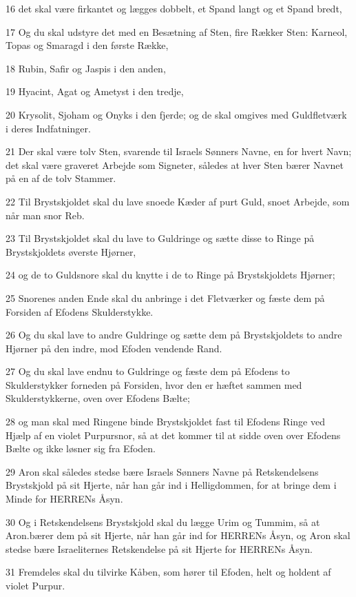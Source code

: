 \par 16 det skal være firkantet og lægges dobbelt, et Spand langt og et Spand bredt,
\par 17 Og du skal udstyre det med en Besætning af Sten, fire Rækker Sten: Karneol, Topas og Smaragd i den første Række,
\par 18 Rubin, Safir og Jaspis i den anden,
\par 19 Hyacint, Agat og Ametyst i den tredje,
\par 20 Krysolit, Sjoham og Onyks i den fjerde; og de skal omgives med Guldfletværk i deres Indfatninger.
\par 21 Der skal være tolv Sten, svarende til Israels Sønners Navne, en for hvert Navn; det skal være graveret Arbejde som Signeter, således at hver Sten bærer Navnet på en af de tolv Stammer.
\par 22 Til Brystskjoldet skal du lave snoede Kæder af purt Guld, snoet Arbejde, som når man snor Reb.
\par 23 Til Brystskjoldet skal du lave to Guldringe og sætte disse to Ringe på Brystskjoldets øverste Hjørner,
\par 24 og de to Guldsnore skal du knytte i de to Ringe på Brystskjoldets Hjørner;
\par 25 Snorenes anden Ende skal du anbringe i det Fletværker og fæste dem på Forsiden af Efodens Skulderstykke.
\par 26 Og du skal lave to andre Guldringe og sætte dem på Brystskjoldets to andre Hjørner på den indre, mod Efoden vendende Rand.
\par 27 Og du skal lave endnu to Guldringe og fæste dem på Efodens to Skulderstykker forneden på Forsiden, hvor den er hæftet sammen med Skulderstykkerne, oven over Efodens Bælte;
\par 28 og man skal med Ringene binde Brystskjoldet fast til Efodens Ringe ved Hjælp af en violet Purpursnor, så at det kommer til at sidde oven over Efodens Bælte og ikke løsner sig fra Efoden.
\par 29 Aron skal således stedse bære Israels Sønners Navne på Retskendelsens Brystskjold på sit Hjerte, når han går ind i Helligdommen, for at bringe dem i Minde for HERRENs Åsyn.
\par 30 Og i Retskendelsens Brystskjold skal du lægge Urim og Tummim, så at Aron.bærer dem på sit Hjerte, når han går ind for HERRENs Åsyn, og Aron skal stedse bære Israeliternes Retskendelse på sit Hjerte for HERRENs Åsyn.
\par 31 Fremdeles skal du tilvirke Kåben, som hører til Efoden, helt og holdent af violet Purpur.
